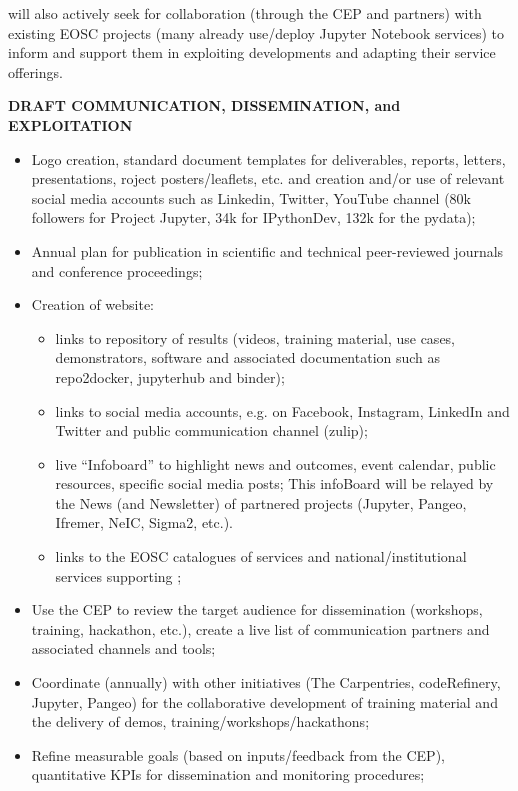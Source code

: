 \TheProject will also actively seek for collaboration (through the CEP and
\TheProject partners) with existing EOSC projects (many already use/deploy
Jupyter Notebook services) to inform and support them in exploiting \TheProject
developments and adapting their service offerings.
\begin{framed}

  \centerline{\textbf{ \TheProject DRAFT COMMUNICATION, DISSEMINATION, and EXPLOITATION }}
  {
  \begin{itemize}

\item Logo creation, standard document templates for deliverables, reports, letters, presentations, roject posters/leaflets, etc. and creation and/or use of relevant social media accounts such as Linkedin, Twitter, YouTube channel (80k followers for Project Jupyter, 34k for IPythonDev, 132k for the pydata);
\item Annual plan for publication in scientific and technical peer-reviewed journals and conference proceedings;
\item Creation of \TheProject website:
\begin{itemize}
\item links to \TheProject repository of results (videos, training material, use cases, demonstrators, software and associated documentation such as repo2docker, jupyterhub and binder);
\item links to social media accounts, e.g. on Facebook, Instagram, LinkedIn and Twitter and public communication channel (zulip);
\item live “Infoboard” to highlight news and outcomes, event calendar, public resources, specific social media posts; This infoBoard will be relayed by the News (and Newsletter) of partnered projects (Jupyter, Pangeo, Ifremer, NeIC, Sigma2, etc.).
\item links to the EOSC catalogues of services and national/institutional services supporting \TheProject;
\end{itemize}
\item Use the CEP to review the target audience for dissemination (workshops, training, hackathon, etc.), create a live list of communication partners and associated channels and tools;
\item Coordinate (annually) with other initiatives (The Carpentries, codeRefinery, Jupyter, Pangeo) for the collaborative development of training material and the delivery of demos, training/workshops/hackathons;
\item Refine measurable goals (based on inputs/feedback from the CEP), quantitative KPIs for dissemination and monitoring procedures;

\end{itemize}}
\end{framed}
